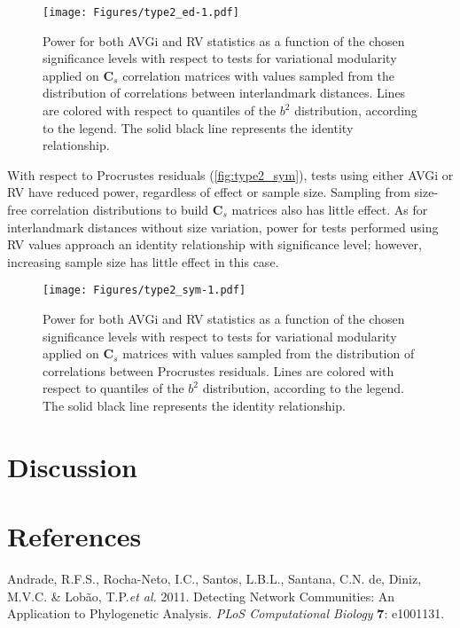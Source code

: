 \documentclass[12pt,]{article}
\begin{document}
\begin{figure}[htbp]
\centering
\texttt{[image: Figures/type2\_ed-1.pdf]}
\caption{Power for both AVGi and RV statistics as a function of the
chosen significance levels with respect to tests for variational
modularity applied on $\mathbf{C}_s$ correlation matrices with values
sampled from the distribution of correlations between interlandmark
distances. Lines are colored with respect to quantiles of the $b^2$
distribution, according to the legend. The solid black line represents
the identity relationship. \label{fig:type2_ed}}
\end{figure}

With respect to Procrustes residuals (\autoref{fig:type2_sym}), tests
using either AVGi or RV have reduced power, regardless of effect or
sample size. Sampling from size-free correlation distributions to build
$\mathbf{C}_s$ matrices also has little effect. As for interlandmark
distances without size variation, power for tests performed using RV
values approach an identity relationship with significance level;
however, increasing sample size has little effect in this case.

\begin{figure}[htbp]
\centering
\texttt{[image: Figures/type2\_sym-1.pdf]}
\caption{Power for both AVGi and RV statistics as a function of the
chosen significance levels with respect to tests for variational
modularity applied on $\mathbf{C}_s$ matrices with values sampled from
the distribution of correlations between Procrustes residuals. Lines are
colored with respect to quantiles of the $b^2$ distribution, according
to the legend. The solid black line represents the identity
relationship. \label{fig:type2_sym}}
\end{figure}

\section{Discussion}\label{discussion}

\section*{References}\label{references}

Andrade, R.F.S., Rocha-Neto, I.C., Santos, L.B.L., Santana, C.N. de,
Diniz, M.V.C. \& Lobão, T.P.\emph{et al.} 2011. Detecting Network
Communities: An Application to Phylogenetic Analysis. \emph{PLoS
Computational Biology} \textbf{7}: e1001131.
\end{document}
